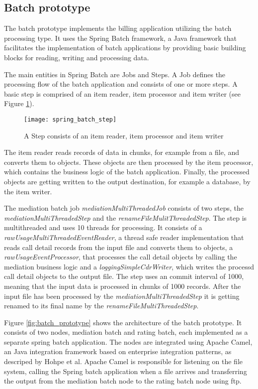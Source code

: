 \subsection{Batch prototype}
The batch prototype implements the billing application utilizing the batch processing type. It uses the Spring Batch framework\cite{springbatch}, a Java framework that facilitates the implementation of batch applications by providing basic building blocks for reading, writing and processing data.

The main entities in Spring Batch are Jobs and Steps. A Job defines the processing flow of the batch application and consists of one or more steps. A basic step is comprised of an item reader, item processor and item writer (see Figure \ref{fig:spring_batch_step}). 
\begin{figure}[h!]
	\centering
	\texttt{[image: spring\_batch\_step]}
	\caption{A Step consists of an item reader, item processor and item writer}
	\label{fig:spring_batch_step}
\end{figure}

The item reader reads records of data in chunks, for example from a file, and converts them to objects. These objects are then processed by the item processor, which contains the business logic of the batch application. Finally, the processed objects are getting written to the output destination, for example a database, by the item writer.

The mediation batch job \emph{mediationMultiThreadedJob} consists of two steps, the \emph{mediationMultiThreadedStep} and the \emph{renameFileMulitThreadedStep}. The step is multithreaded and uses 10 threads for processing. It consists of a \emph{rawUsageMultiThreadedEventReader}, a thread safe reader implementation that reads call detail records from the input file and converts them to objects, a \emph{rawUsageEventProcessor}, that processes the call detail objects by calling the mediation business logic and a \emph{loggingSimpleCdrWriter}, which writes the processd call detail objects to the output file. The step uses an commit interval of 1000, meaning that the input data is processed in chunks of 1000 records. After the input file has been processed by the \emph{mediationMultiThreadedStep} it is getting renamed to its final name by the \emph{renameFileMultiThreadedStep}.

Figure \ref{fig:batch_prototype} shows the architecture of the batch prototype. It consists of two nodes, mediation batch and rating batch, each implemented as a separate spring batch application. The nodes are integrated using Apache Camel\cite{apachecamel}, an Java integration framework based on enterprise integration patterns, as descriped by Hohpe et al.\cite{Hohpe:2003fk} Apache Camel is responsible for listening on the file system, calling the Spring batch application when a file arrives and transferring the output from the mediation batch node to the rating batch node using ftp.


